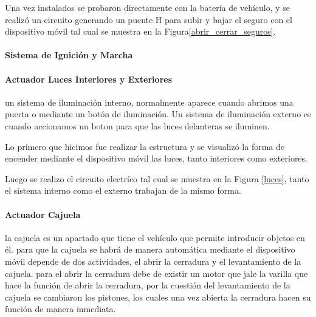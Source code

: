 Una vez instalados se probaron directamente con la batería de vehículo, y se realizó un circuito generando un puente H para subir y bajar el seguro con el dispositivo móvil tal cual se muestra en la Figura\ref{abrir_cerrar_seguros}.
%


\paragraph{Sistema de Ignición y Marcha}




\paragraph{Actuador Luces Interiores y Exteriores}
un sistema de iluminación interno, normalmente aparece cuando abrimos una puerta o mediante un botón de iluminación. Un sistema de iluminación externo es cuando accionamos un boton para que las luces delanteras se iluminen. 

Lo primero que hicimos fue realizar la estructura y se visualizó la forma de encender mediante el dispositivo móvil las luces, tanto interiores como exteriores.

Luego se realizo el circuito electríco tal cual se muestra en la Figura \ref{luces}, tanto el sistema interno como el externo trabajan de la mismo forma.
%


\paragraph{Actuador Cajuela}
la cajuela es un apartado que tiene el vehículo que permite introducir objetos en él.
para que la cajuela se habrá de manera automática mediante el dispositivo móvil depende de dos actividades, el abrir la cerradura y el levantamiento de la cajuela.
para el abrir la cerradura debe de existir un motor que jale la varilla que hace la función de abrir la cerradura, por la cuestión del levantamiento de la cajuela se cambiaron los pistones, los cuales una vez abierta la cerradura hacen su función de manera inmediata.
